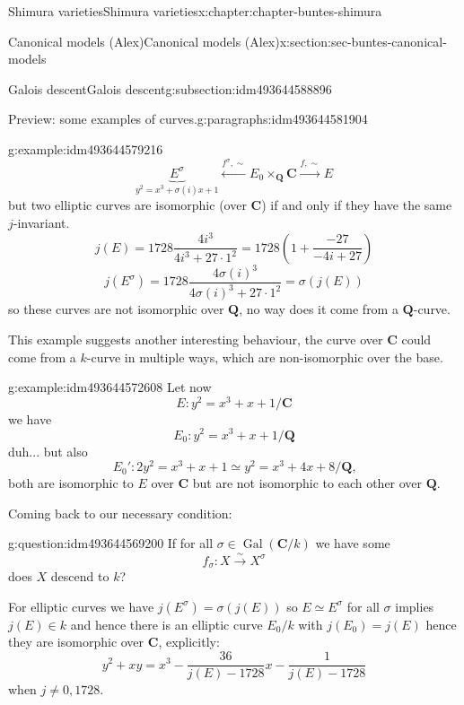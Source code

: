 \documentclass[oneside,10pt,]{book}
\numberwithin{equation}{section}
\newcommand{\QQ}{\mathbf{Q}}
\newcommand{\CC}{\mathbf{C}}
\newcommand{\Gal}[2]{\operatorname{Gal}(#1/#2)}
\begin{document}
\begin{chapterptx}{Shimura varieties}{}{Shimura varieties}{}{}{x:chapter:chapter-buntes-shimura}
\begin{sectionptx}{Canonical models (Alex)}{}{Canonical models (Alex)}{}{}{x:section:sec-buntes-canonical-models}
\begin{subsectionptx}{Galois descent}{}{Galois descent}{}{}{g:subsection:idm493644588896}
\begin{paragraphs}{Preview: some examples of curves.}{g:paragraphs:idm493644581904}
\begin{example}{}{g:example:idm493644579216}
\begin{equation*}
\underbrace{E^\sigma}_{y^2 = x^3 + \sigma(i)x + 1} \xleftarrow{f^\sigma, \sim} E_0 \times_\QQ \CC \xrightarrow{f,\sim} E
\end{equation*}
but two elliptic curves are isomorphic (over \(\CC\)) if and only if they have the same \(j\)-invariant.%
\begin{equation*}
j(E) = 1728 \frac{4i^3}{4i^3 + 27\cdot 1^2} = 1728\left(1+ \frac{ - 27}{-4i + 27}\right)
\end{equation*}
%
\begin{equation*}
j(E^\sigma) = 1728 \frac{4\sigma(i)^3}{4\sigma(i)^3 + 27\cdot 1^2} = \sigma(j(E))
\end{equation*}
so these curves are not isomorphic over \(\QQ\), no way does it come from a \(\QQ\)-curve.%
\end{example}
This example suggests another interesting behaviour, the curve over \(\CC\) could come from  a \(k\)-curve in multiple ways, which are non-isomorphic over the base.%
\begin{example}{}{g:example:idm493644572608}%
Let now%
\begin{equation*}
E \colon y^2 = x^3 + x + 1/\CC
\end{equation*}
we have%
\begin{equation*}
E_0 \colon y^2 = x^3 + x + 1/\QQ
\end{equation*}
duh... but also%
\begin{equation*}
E_0' \colon 2 y^2 = x^3 + x + 1 \simeq y^2 = x^3 + 4 x + 8/\QQ\text{,}
\end{equation*}
both are isomorphic to \(E\) over \(\CC\) but are not isomorphic to each other over \(\QQ\).%
\end{example}
Coming back to our necessary condition:%
\begin{question}{}{g:question:idm493644569200}%
If for all \(\sigma \in \Gal{\CC}{k}\) we have some%
\begin{equation*}
f_\sigma \colon X\xrightarrow{\sim} X^\sigma
\end{equation*}
does \(X\) descend to \(k\)?%
\end{question}
For elliptic curves we have \(j(E^\sigma) = \sigma(j(E))\) so \(E \simeq E^\sigma\) for all \(\sigma\) implies \(j(E) \in k\) and hence there is an elliptic curve \(E_0/ k\) with \(j(E_0) = j(E)\) hence they are isomorphic over \(\CC\), explicitly:%
\begin{equation*}
y^2 + xy = x^3 - \frac{36}{j(E) - 1728} x - \frac{1}{j(E) - 1728}
\end{equation*}
when \(j\ne 0,1728\).%

\end{paragraphs}
\end{subsectionptx}
\end{sectionptx}
\end{chapterptx}
\end{document}
